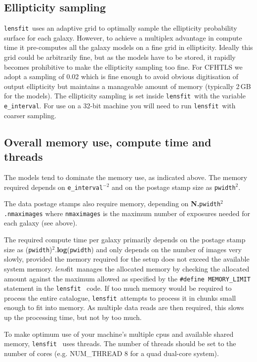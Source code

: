 \documentclass{article}
\def\lensfit{{\tt lensfit}\ }
\def\lensfitsuite{{\em lens}fit\ }
\begin{document}
\subsection{Ellipticity sampling}

\lensfit uses an adaptive grid to optimally sample the ellipticity probability surface for each galaxy.  
However, to achieve a multiplex advantage in compute time it pre-computes all the
galaxy models on a fine grid in ellipticity.  Ideally this grid could be arbitrarily
fine, but as the models have to be stored, it rapidly becomes prohibitive to make the
ellipticity sampling too fine.  For CFHTLS we adopt a sampling of 0.02 which is fine enough
to avoid obvious digitisation of output ellipticity but maintains a manageable amount
of memory (typically 2\,GB for the models).  The ellipticity sampling is set inside
\lensfit with the variable {\tt e\_interval}.  For use on a 32-bit machine you will need to
run \lensfit with coarser sampling.

\subsection{Overall memory use, compute time and threads}

The models tend to dominate the memory use, as indicated above.  The memory required depends
on {\tt e\_interval$^{-2}$} and on the postage stamp size as {\tt pwidth$^2$}.

The data postage stamps also require memory, depending on {\bf N.}{\tt pwidth$^2$.}{\tt nmaximages}
where {\tt nmaximages} is the maximum number of exposures needed for each galaxy (see above).

The required compute time per galaxy primarily depends on the postage stamp size
as ({\tt pwidth})$^2$.{\bf log}({\tt pwidth}) and only depends on the number of images very slowly,
provided the memory required for the setup does not exceed the available system memory.
\lensfitsuite manages the allocated memory by checking the allocated amount against the
maximum allowed as specified by the {\tt \#define MEMORY\_LIMIT} statement in the \lensfit
code.  If too much memory would be required to process the entire catalogue, \lensfit attempts
to process it in chunks small enough to fit into memory.  As multiple data reads are then required,
this slows up the processing time, but not by too much.

To make optimum use of your machine's multiple cpus and available shared memory, \lensfit
uses threads.  The number of threads should be set to the number of cores 
(e.g. NUM\_THREAD 8 for a quad dual-core system). 
\end{document}
